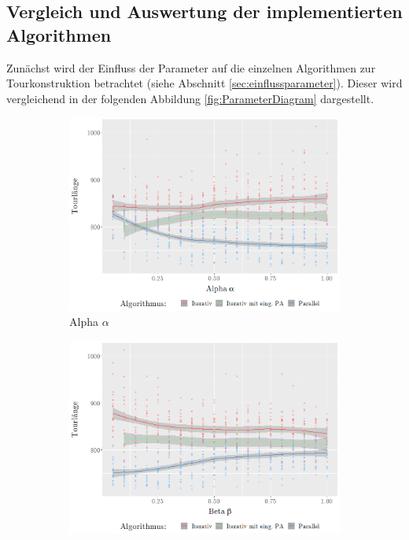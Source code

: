 \documentclass[doktyp=barbeit, sprache=german]{TUBAFarbeiten}
\begin{document}
\subsection{Vergleich und Auswertung der implementierten Algorithmen}
Zunächst wird der Einfluss der Parameter auf die einzelnen Algorithmen zur Tourkonstruktion betrachtet (siehe Abschnitt \ref{sec:einflussparameter}). Dieser wird vergleichend in der folgenden Abbildung \ref{fig:ParameterDiagram} dargestellt. 
\begin{figure}
        \centering
        \begin{subfigure}[b]{0.475\textwidth}
            \centering
            \includegraphics[width=\textwidth]{images/diagramalpha}
            \caption{Alpha $\alpha$}               
            \label{fig:iterativeAlpha}
        \end{subfigure}
        \hfill
        \begin{subfigure}[b]{0.475\textwidth}  
            \centering 
            \includegraphics[width=\textwidth]{images/diagrambeta}

\end{subfigure}
\end{figure}
\end{document}
